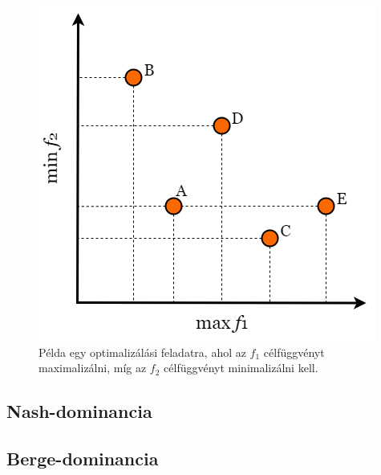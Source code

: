 \begin{figure}[t]
  \centering
  \includegraphics[scale=0.5]{images/pareto_dominance.png}
  \caption{
    Példa egy optimalizálási feladatra, ahol az $f_1$ célfüggvényt maximalizálni, míg az $f_2$ célfüggvényt minimalizálni kell.
  }
  \label{fig:PARETO_DOMINANCE}
\end{figure}


\subsection{Nash-dominancia}



\subsection{Berge-dominancia}
